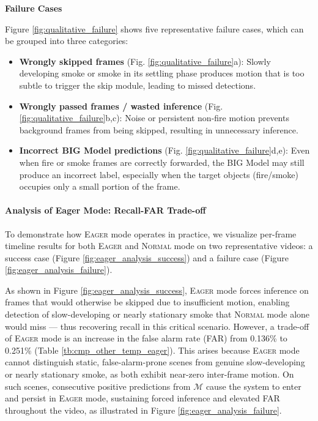 \documentclass[
  10pt,
]{article}
\begin{document}
\textbf{Failure Cases}



Figure \ref{fig:qualitative_failure} shows five representative failure
cases, which can be grouped into three categories:

\begin{itemize}
\item
  \textbf{Wrongly skipped frames} (Fig. \ref{fig:qualitative_failure}a):
  Slowly developing smoke or smoke in its settling phase produces motion
  that is too subtle to trigger the skip module, leading to missed
  detections.
\item
  \textbf{Wrongly passed frames / wasted inference} (Fig.
  \ref{fig:qualitative_failure}b,c): Noise or persistent non-fire motion
  prevents background frames from being skipped, resulting in
  unnecessary inference.
\item
  \textbf{Incorrect BIG Model predictions} (Fig.
  \ref{fig:qualitative_failure}d,e): Even when fire or smoke frames are
  correctly forwarded, the BIG Model may still produce an incorrect
  label, especially when the target objects (fire/smoke) occupies only a
  small portion of the frame.
\end{itemize}

\paragraph{Analysis of Eager Mode: Recall-FAR
Trade-off}\label{sec:analysis_eager}





To demonstrate how \textsc{Eager} mode operates in practice, we
visualize per-frame timeline results for both \textsc{Eager} and
\textsc{Normal} mode on two representative videos: a success case
(Figure \ref{fig:eager_analysis_success}) and a failure case (Figure
\ref{fig:eager_analysis_failure}).

As shown in Figure \ref{fig:eager_analysis_success}, \textsc{Eager} mode
forces inference on frames that would otherwise be skipped due to
insufficient motion, enabling detection of slow-developing or nearly
stationary smoke that \textsc{Normal} mode alone would miss --- thus
recovering recall in this critical scenario. However, a trade-off of
\textsc{Eager} mode is an increase in the false alarm rate (FAR) from
0.136\% to 0.251\% (Table \ref{tb:cmp_other_temp_eager}). This arises
because \textsc{Eager} mode cannot distinguish static, false-alarm-prone
scenes from genuine slow-developing or nearly stationary smoke, as both
exhibit near-zero inter-frame motion. On such scenes, consecutive
positive predictions from \(\mathcal{M}\) cause the system to enter and
persist in \textsc{Eager} mode, sustaining forced inference and elevated
FAR throughout the video, as illustrated in Figure
\ref{fig:eager_analysis_failure}.
\end{document}
